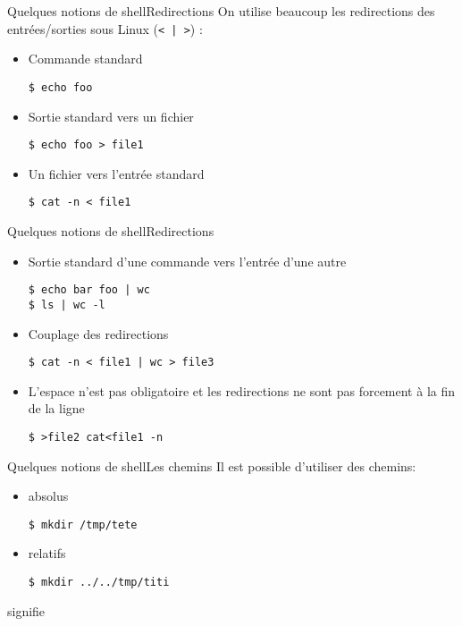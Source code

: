 \begin{frame}[fragile=singleslide]{Quelques notions de shell}{Redirections}
  On utilise beaucoup les  redirections des entrées/sorties sous Linux
  (\verb+< | >+) :
  \begin{itemize}
  \item Commande standard
\begin{lstlisting}
$ echo foo
\end{lstlisting}
  \item Sortie standard vers un fichier
\begin{lstlisting}
$ echo foo > file1
\end{lstlisting}
  \item Un fichier vers l'entrée standard
\begin{lstlisting}
$ cat -n < file1
\end{lstlisting} %
  \end{itemize}
\end{frame}

\begin{frame}[fragile=singleslide]{Quelques notions de shell}{Redirections}
  \begin{itemize}
  \item Sortie standard d'une commande vers l'entrée d'une autre
\begin{lstlisting}
$ echo bar foo | wc
$ ls | wc -l
\end{lstlisting}
  \item Couplage des redirections
\begin{lstlisting}
$ cat -n < file1 | wc > file3
\end{lstlisting} %
  \item L'espace n'est pas obligatoire et les redirections ne sont pas
    forcement à la fin de la ligne
\begin{lstlisting}
$ >file2 cat<file1 -n
\end{lstlisting} %
  \end{itemize}
\end{frame}

\begin{frame}[fragile=singleslide]{Quelques notions de shell}{Les chemins}
  Il est possible d'utiliser des chemins:
  \begin{itemize}
  \item absolus
\begin{lstlisting}
$ mkdir /tmp/tete
\end{lstlisting}
  \item relatifs
\begin{lstlisting}
$ mkdir ../../tmp/titi
\end{lstlisting}
  \end{itemize}
   signifie 
\end{frame}


